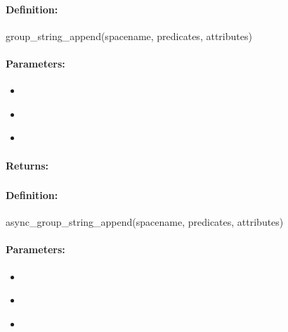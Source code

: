 \paragraph{Definition:}
\begin{rubycode}
group_string_append(spacename, predicates, attributes)
\end{rubycode}

\paragraph{Parameters:}
\begin{itemize}[noitemsep]
\item {}\\

\item {}\\

\item {}\\

\end{itemize}

\paragraph{Returns:}


\pagebreak
\subsubsection{}
\label{api:ruby:async_group_string_append}


\paragraph{Definition:}
\begin{rubycode}
async_group_string_append(spacename, predicates, attributes)
\end{rubycode}

\paragraph{Parameters:}
\begin{itemize}[noitemsep]
\item {}\\

\item {}\\

\item {}\\

\end{itemize}

